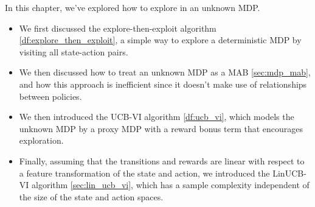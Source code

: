 \documentclass[\main/main]{subfiles}
\begin{document}
In this chapter, we've explored how to explore in an unknown MDP.
\begin{itemize}
    \item  We first discussed the explore-then-exploit algorithm \eqref{df:explore_then_exploit}, a simple way to explore a deterministic MDP by visiting all state-action pairs.
    \item We then discussed how to treat an unknown MDP as a MAB \eqref{sec:mdp_mab}, and how this approach is inefficient since it doesn't make use of relationships between policies.
    \item We then introduced the UCB-VI algorithm \eqref{df:ucb_vi}, which models the unknown MDP by a proxy MDP with a reward bonus term that encourages exploration.
    \item Finally, assuming that the transitions and rewards are linear with respect to a feature transformation of the state and action, we introduced the LinUCB-VI algorithm \eqref{sec:lin_ucb_vi}, which has a sample complexity independent of the size of the state and action spaces.
\end{itemize}
\end{document}
